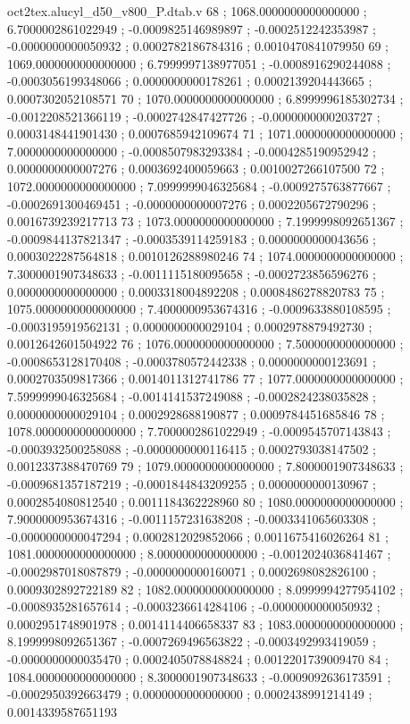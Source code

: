 \begin{filecontents}[overwrite]{oct2tex.alucyl_d50_v800_P.dtab.v}
68 ; 1068.0000000000000000 ; 6.7000002861022949 ; -0.0009825146989897 ; -0.0002512242353987 ; -0.0000000000050932 ; 0.0002782186784316 ; 0.0010470841079950
69 ; 1069.0000000000000000 ; 6.7999997138977051 ; -0.0008916290244088 ; -0.0003056199348066 ; 0.0000000000178261 ; 0.0002139204443665 ; 0.0007302052108571
70 ; 1070.0000000000000000 ; 6.8999996185302734 ; -0.0012208521366119 ; -0.0002742847427726 ; -0.0000000000203727 ; 0.0003148441901430 ; 0.0007685942109674
71 ; 1071.0000000000000000 ; 7.0000000000000000 ; -0.0008507983293384 ; -0.0004285190952942 ; 0.0000000000007276 ; 0.0003692400059663 ; 0.0010027266107500
72 ; 1072.0000000000000000 ; 7.0999999046325684 ; -0.0009275763877667 ; -0.0002691300469451 ; -0.0000000000007276 ; 0.0002205672790296 ; 0.0016739239217713
73 ; 1073.0000000000000000 ; 7.1999998092651367 ; -0.0009844137821347 ; -0.0003539114259183 ; 0.0000000000043656 ; 0.0003022287564818 ; 0.0010126288980246
74 ; 1074.0000000000000000 ; 7.3000001907348633 ; -0.0011115180095658 ; -0.0002723856596276 ; 0.0000000000000000 ; 0.0003318004892208 ; 0.0008486278820783
75 ; 1075.0000000000000000 ; 7.4000000953674316 ; -0.0009633880108595 ; -0.0003195919562131 ; 0.0000000000029104 ; 0.0002978879492730 ; 0.0012642601504922
76 ; 1076.0000000000000000 ; 7.5000000000000000 ; -0.0008653128170408 ; -0.0003780572442338 ; 0.0000000000123691 ; 0.0002703509817366 ; 0.0014011312741786
77 ; 1077.0000000000000000 ; 7.5999999046325684 ; -0.0014141537249088 ; -0.0002824238035828 ; 0.0000000000029104 ; 0.0002928688190877 ; 0.0009784451685846
78 ; 1078.0000000000000000 ; 7.7000002861022949 ; -0.0009545707143843 ; -0.0003932500258088 ; -0.0000000000116415 ; 0.0002793038147502 ; 0.0012337388470769
79 ; 1079.0000000000000000 ; 7.8000001907348633 ; -0.0009681357187219 ; -0.0001844843209255 ; 0.0000000000130967 ; 0.0002854080812540 ; 0.0011184362228960
80 ; 1080.0000000000000000 ; 7.9000000953674316 ; -0.0011157231638208 ; -0.0003341065603308 ; -0.0000000000047294 ; 0.0002812029852066 ; 0.0011675416026264
81 ; 1081.0000000000000000 ; 8.0000000000000000 ; -0.0012024036841467 ; -0.0002987018087879 ; -0.0000000000160071 ; 0.0002698082826100 ; 0.0009302892722189
82 ; 1082.0000000000000000 ; 8.0999994277954102 ; -0.0008935281657614 ; -0.0003236614284106 ; -0.0000000000050932 ; 0.0002951748901978 ; 0.0014114406658337
83 ; 1083.0000000000000000 ; 8.1999998092651367 ; -0.0007269496563822 ; -0.0003492993419059 ; -0.0000000000035470 ; 0.0002405078848824 ; 0.0012201739009470
84 ; 1084.0000000000000000 ; 8.3000001907348633 ; -0.0009092636173591 ; -0.0002950392663479 ; 0.0000000000000000 ; 0.0002438991214149 ; 0.0014339587651193

\end{filecontents}
